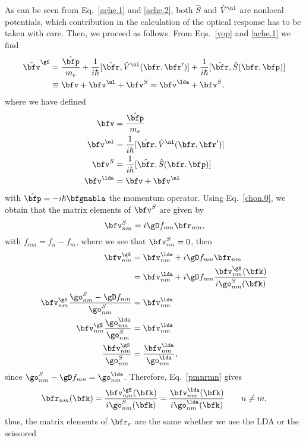 \documentclass[floatfix,prb,aps,superscriptaddress,11pt,preprint,letterpaper]{revtex4}
\begin{document}
As can be seen from Eq.~\eqref{ache.1} and \eqref{ache.2},
both $\hat S$ and $\hat V^\nl$ are nonlocal potentials, which contribution 
in the calculation of the optical response has to be taken with care.
Then, we proceed as follows. From Eqs.~\eqref{vop} and \eqref{ache.1} we find
\begin{align}\label{vop2}
\hat\bfv^\gS&=
\frac{\hat\bfp}{m_e}
+
\frac{1}{i\hbar}[\hat\bfr,\hat V^\nl(\bfr,\bfr')]
+
\frac{1}{i\hbar}[\hat\bfr,\hat S(\bfr,\bfp)]
\nonumber\\
&\equiv
\bfv
+
\bfv^\nl
+\bfv^S
=
\bfv^\lda
+\bfv^S
,
\end{align}
where we have defined
\begin{align}\label{conhr}
\bfv
&=\frac{\hat\bfp}{m_e}
\nonumber\\
\bfv^\nl
&=
\frac{1}{i\hbar}[\hat\bfr,\hat V^\nl(\bfr,\bfr')]
\nonumber\\
\bfv^S
&=
\frac{1}{i\hbar}[\hat\bfr,\hat S(\bfr,\bfp)]
\nonumber\\
\bfv^\lda
&=
\bfv
+\bfv^\nl
\end{align}  
with $\hat\bfp=-i\hbar\bfgnabla$ the momentum operator.
Using Eq.~\eqref{chon.0}, we obtain that the
matrix elements of $\bfv^S$ are given by
\begin{equation}\label{chon.2} 
\bfv^S_{nm}=i\gD f_{mn}\bfr_{nm},
\end{equation}
with $f_{nm}=f_n-f_m$,
where we see that $\bfv^S_{nn}=0$, then
\begin{align}\label{chon.8}
\bfv^\gS_{nm}
&=
\bfv^\lda_{nm}+i\gD f_{mn}\bfr_{nm}
\nonumber\\
&=
\bfv^\lda_{nm}+i\gD f_{mn}\frac{\bfv^\gS_{nm}(\bfk)}{i\go^S_{nm}(\bfk)}
\nonumber\\
\bfv^\gS_{nm}
\frac{\go^S_{nm}-\gD f_{mn}}{\go^S_{nm}}
&=
\bfv^\lda_{nm}
\nonumber\\
\bfv^\gS_{nm}
\frac{\go^\lda_{nm}}{\go^S_{nm}}
&=
\bfv^\lda_{nm}
\nonumber\\
\frac{\bfv^\gS_{nm}}{\go^S_{nm}}
&=
\frac{\bfv^\lda_{nm}}{\go^\lda_{nm}}
,
\end{align}
since
$\go^S_{nm}-\gD f_{mn}=\go^\lda_{nm}$. Therefore, 
Eq.~\eqref{pmnrmn} gives
\begin{align}\label{chon.10}
\bfr_{nm}(\bfk)
=
\frac{\bfv^\gS_{nm}(\bfk)}{i\go^S_{nm}(\bfk)}
=
\frac{\bfv^\lda_{nm}(\bfk)}{i\go^\lda_{nm}(\bfk)}
\quad\quad n\ne m
,
\end{align}
thus,
the matrix elements
of $\bfr_e$ are the same whether we use the LDA or the scissored
\end{document}
